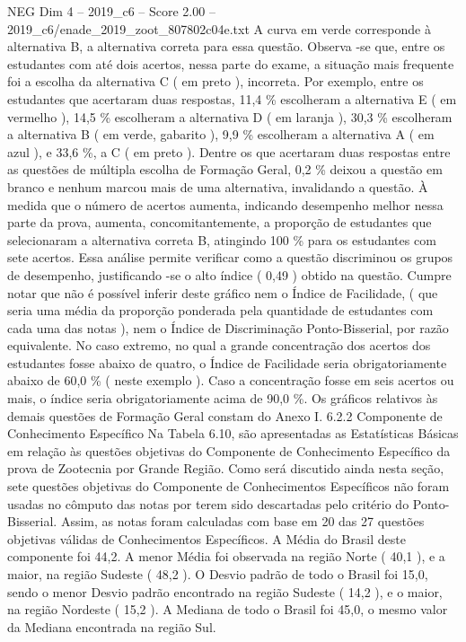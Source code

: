 \begin{textsample}{NEG Dim 4 – 2019\_c6 – Score 2.00 – 2019\_c6/enade\_2019\_zoot\_807802c04e.txt}
A curva em verde corresponde à alternativa B, a alternativa correta para essa questão.
Observa -se que, entre os estudantes com até dois acertos, nessa parte do exame, a situação mais frequente foi a escolha da alternativa C ( em preto ), incorreta.
Por exemplo, entre os estudantes que acertaram duas respostas, 11,4 \% escolheram a alternativa E ( em vermelho ), 14,5 \% escolheram a alternativa D ( em laranja ), 30,3 \% escolheram a alternativa B ( em verde, gabarito ), 9,9 \% escolheram a alternativa A ( em azul ), e 33,6 \%, a C ( em preto ).
Dentre os que acertaram duas respostas entre as questões de múltipla escolha de Formação Geral, 0,2 \% deixou a questão em branco e nenhum marcou mais de uma alternativa, invalidando a questão.
À medida que o número de acertos aumenta, indicando desempenho melhor nessa parte da prova, aumenta, concomitantemente, a proporção de estudantes que selecionaram a alternativa correta B, atingindo 100 \% para os estudantes com sete acertos.
Essa análise permite verificar como a questão discriminou os grupos de desempenho, justificando -se o alto índice ( 0,49 ) obtido na questão.
Cumpre notar que não é possível inferir deste gráfico nem o Índice de Facilidade, ( que seria uma média da proporção ponderada pela quantidade de estudantes com cada uma das notas ), nem o Índice de Discriminação Ponto-Bisserial, por razão equivalente.
No caso extremo, no qual a grande concentração dos acertos dos estudantes fosse abaixo de quatro, o Índice de Facilidade seria obrigatoriamente abaixo de 60,0 \% ( neste exemplo ).
Caso a concentração fosse em seis acertos ou mais, o índice seria obrigatoriamente acima de 90,0 \%.
Os gráficos relativos às demais questões de Formação Geral constam do Anexo I. 6.2.2 Componente de Conhecimento Específico Na Tabela 6.10, são apresentadas as Estatísticas Básicas em relação às questões objetivas do Componente de Conhecimento Específico da prova de Zootecnia por Grande Região.
Como será discutido ainda nesta seção, sete questões objetivas do Componente de Conhecimentos Específicos não foram usadas no cômputo das notas por terem sido descartadas pelo critério do Ponto-Bisserial.
Assim, as notas foram calculadas com base em 20 das 27 questões objetivas válidas de Conhecimentos Específicos.
A Média do Brasil deste componente foi 44,2.
A menor Média foi observada na região Norte ( 40,1 ), e a maior, na região Sudeste ( 48,2 ).
O Desvio padrão de todo o Brasil foi 15,0, sendo o menor Desvio padrão encontrado na região Sudeste ( 14,2 ), e o maior, na região Nordeste ( 15,2 ).
A Mediana de todo o Brasil foi 45,0, o mesmo valor da Mediana encontrada na região Sul.

\end{textsample}
